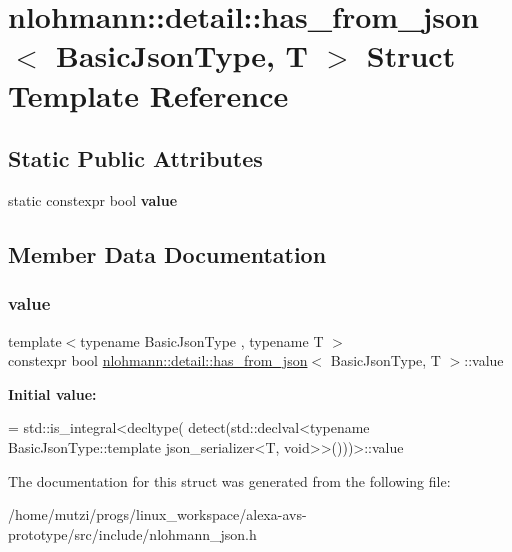 \hypertarget{structnlohmann_1_1detail_1_1has__from__json}{}\section{nlohmann\+:\+:detail\+:\+:has\+\_\+from\+\_\+json$<$ Basic\+Json\+Type, T $>$ Struct Template Reference}
\label{structnlohmann_1_1detail_1_1has__from__json}
\subsection*{Static Public Attributes}
\begin{DoxyCompactItemize}
\item 
static constexpr bool {\bfseries value}
\end{DoxyCompactItemize}


\subsection{Member Data Documentation}
\mbox{\label{structnlohmann_1_1detail_1_1has__from__json_a16701d806343c58ae7e884024dd14955}} 
\subsubsection{\texorpdfstring{value}{value}}
{\footnotesize\ttfamily template$<$typename Basic\+Json\+Type , typename T $>$ \\
constexpr bool \hyperlink{structnlohmann_1_1detail_1_1has__from__json}{nlohmann\+::detail\+::has\+\_\+from\+\_\+json}$<$ Basic\+Json\+Type, T $>$\+::value\hspace{0.3cm}{\ttfamily [static]}}

{\bfseries Initial value\+:}
\begin{DoxyCode}
= std::is\_integral<decltype(
                                      detect(std::declval<\textcolor{keyword}{typename} BasicJsonType::template 
      json\_serializer<T, void>>()))>::value
\end{DoxyCode}


The documentation for this struct was generated from the following file\+:\begin{DoxyCompactItemize}
\item 
/home/mutzi/progs/linux\+\_\+workspace/alexa-\/avs-\/prototype/src/include/nlohmann\+\_\+json.\+h\end{DoxyCompactItemize}
